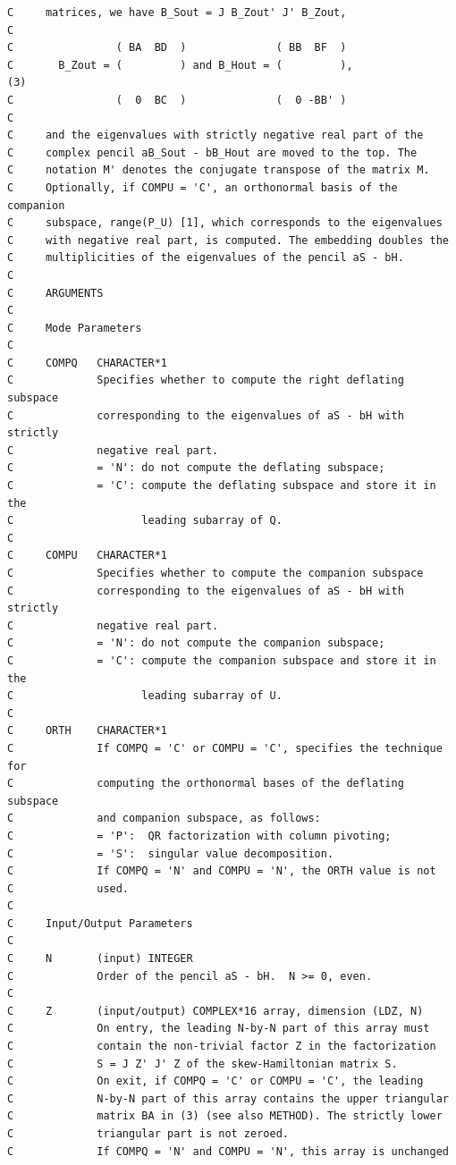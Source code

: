 \documentclass[a4paper,10pt]{article}
\begin{document}
\begin{verbatim}
C     matrices, we have B_Sout = J B_Zout' J' B_Zout,
C
C                ( BA  BD  )              ( BB  BF  )
C       B_Zout = (         ) and B_Hout = (         ),               (3)
C                (  0  BC  )              (  0 -BB' )
C
C     and the eigenvalues with strictly negative real part of the
C     complex pencil aB_Sout - bB_Hout are moved to the top. The 
C     notation M' denotes the conjugate transpose of the matrix M.
C     Optionally, if COMPU = 'C', an orthonormal basis of the companion
C     subspace, range(P_U) [1], which corresponds to the eigenvalues
C     with negative real part, is computed. The embedding doubles the
C     multiplicities of the eigenvalues of the pencil aS - bH.
C
C     ARGUMENTS
C
C     Mode Parameters
C
C     COMPQ   CHARACTER*1
C             Specifies whether to compute the right deflating subspace
C             corresponding to the eigenvalues of aS - bH with strictly
C             negative real part.
C             = 'N': do not compute the deflating subspace;
C             = 'C': compute the deflating subspace and store it in the
C                    leading subarray of Q.
C
C     COMPU   CHARACTER*1
C             Specifies whether to compute the companion subspace
C             corresponding to the eigenvalues of aS - bH with strictly
C             negative real part.
C             = 'N': do not compute the companion subspace;
C             = 'C': compute the companion subspace and store it in the
C                    leading subarray of U.
C
C     ORTH    CHARACTER*1
C             If COMPQ = 'C' or COMPU = 'C', specifies the technique for
C             computing the orthonormal bases of the deflating subspace
C             and companion subspace, as follows:
C             = 'P':  QR factorization with column pivoting;
C             = 'S':  singular value decomposition.
C             If COMPQ = 'N' and COMPU = 'N', the ORTH value is not
C             used.
C
C     Input/Output Parameters
C
C     N       (input) INTEGER
C             Order of the pencil aS - bH.  N >= 0, even.
C
C     Z       (input/output) COMPLEX*16 array, dimension (LDZ, N)
C             On entry, the leading N-by-N part of this array must
C             contain the non-trivial factor Z in the factorization
C             S = J Z' J' Z of the skew-Hamiltonian matrix S.
C             On exit, if COMPQ = 'C' or COMPU = 'C', the leading
C             N-by-N part of this array contains the upper triangular
C             matrix BA in (3) (see also METHOD). The strictly lower
C             triangular part is not zeroed.
C             If COMPQ = 'N' and COMPU = 'N', this array is unchanged

\end{verbatim}
\end{document}
